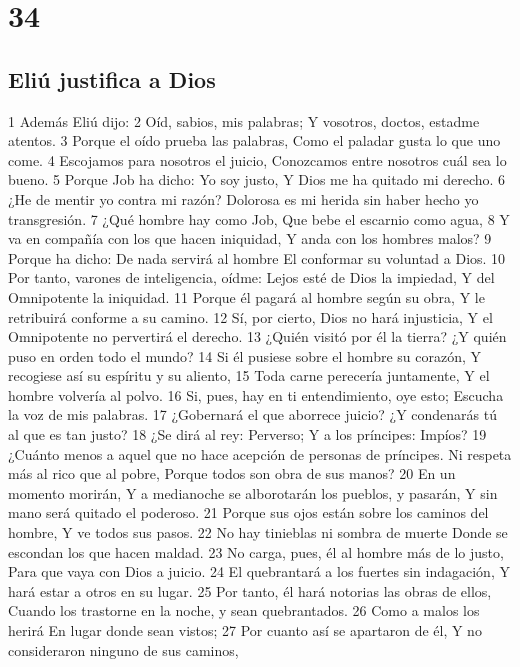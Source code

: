 \chapter{34}

\section*{Eliú justifica a Dios}

1 Además Eliú dijo:
2 Oíd, sabios, mis palabras;
Y vosotros, doctos, estadme atentos.
3 Porque el oído prueba las palabras,
Como el paladar gusta lo que uno come.
4 Escojamos para nosotros el juicio,
Conozcamos entre nosotros cuál sea lo bueno.
5 Porque Job ha dicho: Yo soy justo,
Y Dios me ha quitado mi derecho.
6 ¿He de mentir yo contra mi razón?
Dolorosa es mi herida sin haber hecho yo transgresión.
7 ¿Qué hombre hay como Job,
Que bebe el escarnio como agua,
8 Y va en compañía con los que hacen iniquidad,
Y anda con los hombres malos?
9 Porque ha dicho: De nada servirá al hombre
El conformar su voluntad a Dios.
10 Por tanto, varones de inteligencia, oídme:
Lejos esté de Dios la impiedad,
Y del Omnipotente la iniquidad.
11 Porque él pagará al hombre según su obra,
Y le retribuirá conforme a su camino. 
12 Sí, por cierto, Dios no hará injusticia,
Y el Omnipotente no pervertirá el derecho.
13 ¿Quién visitó por él la tierra?
¿Y quién puso en orden todo el mundo?
14 Si él pusiese sobre el hombre su corazón,
Y recogiese así su espíritu y su aliento,
15 Toda carne perecería juntamente,
Y el hombre volvería al polvo.
16 Si, pues, hay en ti entendimiento, oye esto;
Escucha la voz de mis palabras.
17 ¿Gobernará el que aborrece juicio?
¿Y condenarás tú al que es tan justo?
18 ¿Se dirá al rey: Perverso;
Y a los príncipes: Impíos?
19 ¿Cuánto menos a aquel que no hace acepción de personas de príncipes.
Ni respeta más al rico que al pobre,
Porque todos son obra de sus manos?
20 En un momento morirán,
Y a medianoche se alborotarán los pueblos, y pasarán,
Y sin mano será quitado el poderoso.
21 Porque sus ojos están sobre los caminos del hombre,
Y ve todos sus pasos.
22 No hay tinieblas ni sombra de muerte
Donde se escondan los que hacen maldad.
23 No carga, pues, él al hombre más de lo justo,
Para que vaya con Dios a juicio. 
24 El quebrantará a los fuertes sin indagación,
Y hará estar a otros en su lugar.
25 Por tanto, él hará notorias las obras de ellos,
Cuando los trastorne en la noche, y sean quebrantados.
26 Como a malos los herirá
En lugar donde sean vistos;
27 Por cuanto así se apartaron de él,
Y no consideraron ninguno de sus caminos,
